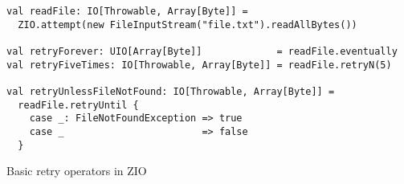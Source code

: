 \begin{algorithm}

\begin{verbatim}
val readFile: IO[Throwable, Array[Byte]] =
  ZIO.attempt(new FileInputStream("file.txt").readAllBytes())

val retryForever: UIO[Array[Byte]]             = readFile.eventually
val retryFiveTimes: IO[Throwable, Array[Byte]] = readFile.retryN(5)

val retryUnlessFileNotFound: IO[Throwable, Array[Byte]] =
  readFile.retryUntil {
    case _: FileNotFoundException => true
    case _                        => false
  }
\end{verbatim}

\caption{Basic retry operators in ZIO \label{zio:retry}}
\end{algorithm}